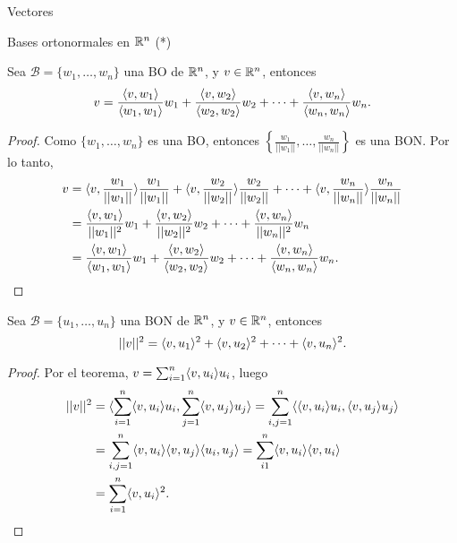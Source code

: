 \begin{chapter}{Vectores}
\begin{section}{Bases ortonormales en $\mathbb R^n$ (*)}
    \begin{corolario}\label{cor-gm-rn-1}
        Sea $\mathcal B =\{w_1,\ldots,w_n\}$ una BO de $\mathbb R^n$, y $v \in \mathbb R^n$, entonces
        \begin{equation*}
            v = \frac{\langle v,w_1\rangle}{ \langle w_1, w_1\rangle} w_1 +\frac{\langle v,w_2\rangle}{\langle w_2, w_2\rangle} w_2 +\cdots+\frac{\langle v,w_n\rangle}{\langle w_n, w_n\rangle} w_n. 
        \end{equation*} 
    \end{corolario}
    \begin{proof}
        Como $\{w_1,\ldots,w_n\}$ es una BO,  entonces 
        $\displaystyle\left\{\frac{w_1}{|| w_1||},\ldots,\frac{w_n}{|| w_n||}\right\}$ es una BON. Por lo tanto, 
        \begin{align*}
            v &= \langle v,\frac{w_1}{|| w_1||}\rangle \frac{w_1}{|| w_1||} +\langle v,\frac{w_2}{|| w_2||}\rangle \frac{w_2}{|| w_2||}
             +\cdots+\langle v,\frac{w_n}{|| w_n||}\rangle \frac{w_n}{|| w_n||} \\
             &=  \frac{\langle v,w_1\rangle}{|| w_1||^2} w_1 +\frac{\langle v,w_2\rangle}{|| w_2||^2} w_2 +\cdots+\frac{\langle v,w_n\rangle}{|| w_n||^2} w_n \\
             &= \frac{\langle v,w_1\rangle}{ \langle w_1, w_1\rangle} w_1 +\frac{\langle v,w_2\rangle}{\langle w_2, w_2\rangle} w_2 +\cdots+\frac{\langle v,w_n\rangle}{\langle w_n, w_n\rangle} w_n.
        \end{align*}
    \end{proof}

    \begin{corolario}
        Sea $\mathcal B =\{u_1,\ldots,u_n\}$ una BON de $\mathbb R^n$, y $v \in \mathbb R^n$, entonces
        \begin{equation*}
            ||v||^2 = \langle v,u_1\rangle^2 +\langle v,u_2\rangle^2  +\cdots+\langle v,u_n\rangle^2.
        \end{equation*} 
    \end{corolario}
    \begin{proof}
        Por el teorema, $v = \sum_{i=1}^n  \langle v,u_i\rangle u_i$, luego
        \begin{align*}
            ||v||^2 &= \langle  \sum_{i=1}^n  \langle v,u_i\rangle u_i,  \sum_{j=1}^n  \langle v,u_j\rangle u_j \rangle= \sum_{i,j=1}^n\langle \langle v,u_i\rangle u_i,  \langle v,u_j\rangle u_j \rangle \\
            &= \sum_{i,j=1}^n\langle v,u_i\rangle\langle v,u_j\rangle\langle  u_i,   u_j \rangle = \sum_{i1}^n\langle v,u_i\rangle\langle v,u_i\rangle\\
            &= \sum_{i=1}^n\langle v,u_i\rangle^2.
        \end{align*}


\end{proof}
\end{section}
\end{chapter}
